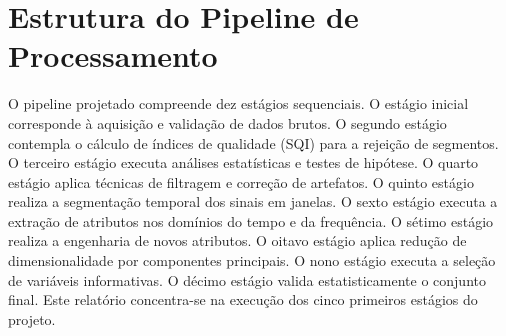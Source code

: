 \section{Estrutura do Pipeline de Processamento}

O pipeline projetado compreende dez estágios sequenciais. O estágio inicial corresponde à aquisição e validação de dados brutos. O segundo estágio contempla o cálculo de índices de qualidade (SQI) para a rejeição de segmentos. O terceiro estágio executa análises estatísticas e testes de hipótese. O quarto estágio aplica técnicas de filtragem e correção de artefatos. O quinto estágio realiza a segmentação temporal dos sinais em janelas. O sexto estágio executa a extração de atributos nos domínios do tempo e da frequência. O sétimo estágio realiza a engenharia de novos atributos. O oitavo estágio aplica redução de dimensionalidade por componentes principais. O nono estágio executa a seleção de variáveis informativas. O décimo estágio valida estatisticamente o conjunto final. Este relatório concentra-se na execução dos cinco primeiros estágios do projeto.
